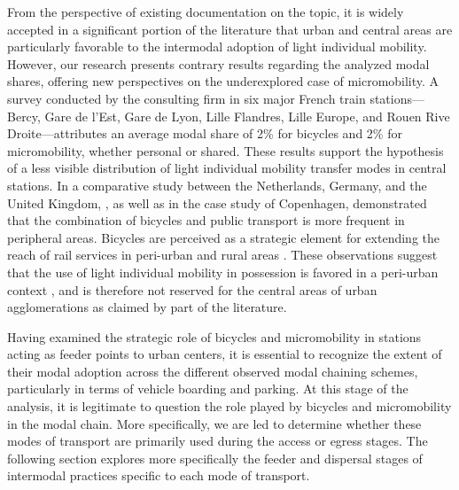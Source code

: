 \begin{refsegment}
From the perspective of existing documentation on the topic, it is widely accepted in a significant portion of the literature that urban and central areas are particularly favorable to the intermodal adoption of light individual mobility. However, our research presents contrary results regarding the analyzed modal shares, offering new perspectives on the underexplored case of micromobility. A survey conducted by the consulting firm \textcolor{blue}{\textcite[18]{enov_enquete_2021}} in six major French train stations—Bercy, Gare de l'Est, Gare de Lyon, Lille Flandres, Lille Europe, and Rouen Rive Droite—attributes an average modal share of 2\% for bicycles and 2\% for micromobility, whether personal or shared. These results support the hypothesis of a less visible distribution of light individual mobility transfer modes in central stations. In a comparative study between the Netherlands, Germany, and the United Kingdom, \textcolor{blue}{\textcite[291]{martens_bicycle_2004}}, as well as \textcolor{blue}{\textcite[25]{halldorsdottir_home-end_2017}} in the case study of Copenhagen, demonstrated that the combination of bicycles and public transport is more frequent in peripheral areas. Bicycles are perceived as a strategic element for extending the reach of rail services in peri-urban and rural areas \textcolor{blue}{\autocite[86]{zuo_incorporating_2021}}. These observations suggest that the use of light individual mobility in possession is favored in a peri-urban context \textcolor{blue}{\autocite[38]{stransky_periurbain_2019}}, and is therefore not reserved for the central areas of urban agglomerations as claimed by part of the literature.%

Having examined the strategic role of bicycles and micromobility in stations acting as feeder points to urban centers, it is essential to recognize the extent of their modal adoption across the different observed modal chaining schemes, particularly in terms of vehicle boarding and parking. At this stage of the analysis, it is legitimate to question the role played by bicycles and micromobility in the modal chain. More specifically, we are led to determine whether these modes of transport are primarily used during the access or egress stages. The following section explores more specifically the feeder and dispersal stages of intermodal practices specific to each mode of transport.%


\end{refsegment}

